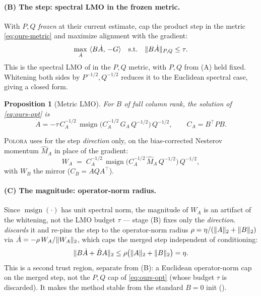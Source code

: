 \documentclass[11pt]{article}
\DeclarePairedDelimiter{\norm}{\lVert}{\rVert}
\DeclareMathOperator{\polar}{msign}          %
\newcommand{\methodname}{\textsc{Polora}\xspace}
\theoremstyle{plain}
\newtheorem{proposition}{Proposition}
\theoremstyle{definition}
\theoremstyle{remark}
\begin{document}
\paragraph{(B) The step: spectral LMO in the frozen metric.} With $P,Q$ \emph{frozen} at their current estimate, cap the product step in the metric \eqref{eq:ours-metric} and maximize alignment with the gradient:
\begin{equation}
  \max_{\dot A}\ \langle B\dot A,\,-G\rangle
  \quad\text{s.t.}\quad
  \norm{B\dot A}_{P,Q}\le\tau .
  \label{eq:ours-opt}
\end{equation}
This is the spectral LMO of  in the $P,Q$ metric, with $P,Q$ from (A) held fixed. Whitening both sides by $P^{-1/2},Q^{-1/2}$ reduces it to the Euclidean spectral case, giving a closed form.
\begin{proposition}[Metric LMO]\label{prop:ours}
For $B$ of full column rank, the solution of \eqref{eq:ours-opt} is
\begin{equation*}
  \dot A = -\tau\,C_A^{-1/2}\,\polar\!\big(C_A^{-1/2}\,G_A\,Q^{-1/2}\big)\,Q^{-1/2},
  \qquad C_A=B^\top P B .
\end{equation*}
\end{proposition}
\medskip
\noindent \methodname{} uses  for the step \emph{direction} only, on the bias-corrected Nesterov momentum $\hat M_A$ in place of the gradient:
\begin{equation}
  W_A \;=\; C_A^{-1/2}\,\polar\!\big(C_A^{-1/2}\,\hat M_A\,Q^{-1/2}\big)\,Q^{-1/2},
  \label{eq:ours-lmo}
\end{equation}
with $W_B$ the mirror ($C_B=AQA^\top$).

\paragraph{(C) The magnitude: operator-norm radius.} Since $\polar(\cdot)$ has unit spectral norm, the magnitude of $W_A$ is an artifact of the whitening, not the LMO budget $\tau$ --- stage (B) fixes only the \emph{direction}.  \emph{discards} it and re-pins the step to the operator-norm radius $\rho=\eta/(\norm{A}_2+\norm{B}_2)$ via $\dot A=-\rho\,W_A/\norm{W_A}_2$, which caps the merged step independent of conditioning:
\begin{equation}
  \norm{B\dot A+\dot B A}_2\le\rho\big(\norm{A}_2+\norm{B}_2\big)=\eta .
  \label{eq:ours-prodcap}
\end{equation}
This is a second trust region, separate from (B): a Euclidean operator-norm cap on the merged step, not the $P,Q$ cap of \eqref{eq:ours-opt} (whose budget $\tau$ is discarded). It makes the method stable from the standard $B{=}0$ init ().
\end{document}
